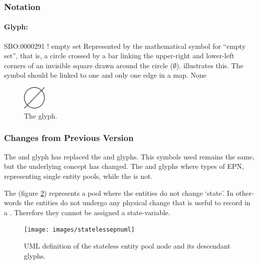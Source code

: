 \subsubsection{Notation}

\paragraph{Glyph: }

\begin{glyphDescription}
\glyphSboTerm SBO:0000291 ! empty set
\glyphContainer Represented by the mathematical symbol for ``empty
set'', that is, a circle crossed by a bar linking the upper-right and
lower-left corners of an invisible square drawn around the circle ($\emptyset$).
 illustrates this.  The symbol should be linked to one
and only one edge in a map.
\glyphLabel None
\end{glyphDescription}

\begin{figure}[htb]
  \centering
  \includegraphics[width = 0.1\textwidth]{images/sourceSink}
  \caption{The  glyph.}
  \label{fig:techref:sourceSink}
\end{figure}

\subsubsection{Changes from Previous Version}

The  and  glyph has replaced the
 and  glyphs. This symbols used remains the
same, but the underlying concept has changed. The  and
 glyphs where types of EPN, representing single entity
pools, while the  is not.

\label{defn:StatelessEPN}

The  (figure \ref{fig:techref:statelessepnuml})
represents a pool where the entities do not change `state'. In
other-words the entities do not undergo any physical change that is
useful to record in a \PDm. Therefore they cannot be assigned
a state-variable.

\begin{figure}[htb]
  \centering
  \texttt{[image: images/statelessepnuml]}
  \caption{UML definition of the stateless entity pool node and its
    descendant glyphs.}
  \label{fig:techref:statelessepnuml}
\end{figure}

